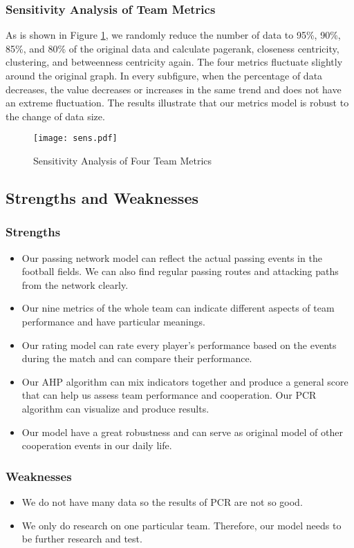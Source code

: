 \documentclass[12pt]{mcmthesis}
\begin{document}
\subsubsection{Sensitivity Analysis of Team Metrics}
	As is shown in Figure \ref{fig:sens_team}, we randomly reduce the number of data to 95\%, 90\%, 85\%, and 80\% of the original data and calculate pagerank, closeness centricity, clustering, and betweenness centricity again. The four metrics fluctuate slightly around the original graph. In every subfigure, when the percentage of data decreases, the value decreases or increases in the same trend and does not have an extreme fluctuation. The results illustrate that our metrics model is robust to the change of data size.
\begin{figure}[h]
	\centering
	\texttt{[image: sens.pdf]}
	\caption{Sensitivity Analysis of Four Team Metrics}
	\label{fig:sens_team}
\end{figure}
\subsection{Strengths and Weaknesses}
\subsubsection{Strengths}
	\begin{itemize}
		\item Our passing network model can reflect the actual passing events in the football fields. We can also find regular passing routes and attacking paths from the network clearly.
		\item Our nine metrics of the whole team can indicate different aspects of team performance and have particular meanings.
		\item Our rating model can rate every player's performance based on the events during the match and can compare their performance.
		\item Our AHP algorithm can mix indicators together and produce a general score that can help us assess team performance and cooperation. Our PCR algorithm can visualize and produce results.
		\item  Our model have a great robustness and can serve as original model of other cooperation events in our daily life.
	\end{itemize}
\subsubsection{Weaknesses}
	\begin{itemize}
		\item We do not have many data so the results of PCR are not so good.
		\item We only do research on one particular team. Therefore, our model needs to be further research and test.
	\end{itemize}
\end{document}
